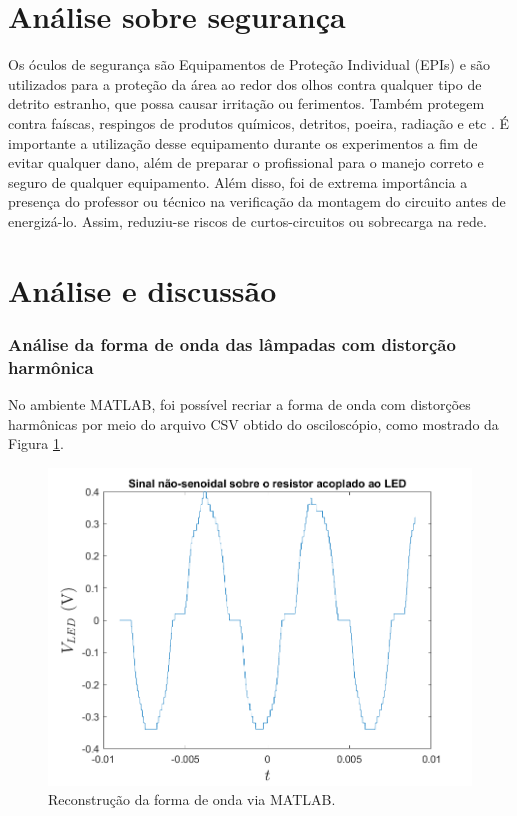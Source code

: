 \documentclass[a4paper,12pt,oneside,openany,table,xcdraw]{article}
\begin{document}
\section{Análise sobre segurança} %
Os óculos de segurança são Equipamentos de Proteção Individual (EPIs) e são utilizados para a proteção da área ao redor dos olhos contra qualquer tipo de detrito estranho, que possa causar irritação ou ferimentos. Também protegem contra faíscas, respingos de produtos químicos, detritos, poeira, radiação e etc \cite{safe}.
É importante a utilização desse equipamento durante os experimentos a fim de evitar qualquer dano, além de preparar o profissional para o manejo correto e seguro de qualquer equipamento.
Além disso, foi de extrema importância a presença do professor ou técnico na verificação da montagem do circuito antes de energizá-lo. Assim, reduziu-se riscos de curtos-circuitos ou sobrecarga na rede.

\vspace{0.2cm}
\section{Análise e discussão} \label{analise} %
\subsubsection{Análise da forma de onda das lâmpadas com distorção harmônica}
No ambiente MATLAB, foi possível recriar a forma de onda com distorções harmônicas por meio do arquivo CSV obtido do osciloscópio, como mostrado da Figura \ref{m1:matlab:image}.

\vspace{0.6cm}
\begin{figure}[H]
\centering
\includegraphics[width=13cm]{Sinal_IN}
\caption{Reconstrução da forma de onda via MATLAB.}
\label{m1:matlab:image}
\end{figure}
\vspace{0.1cm}
\end{document}
